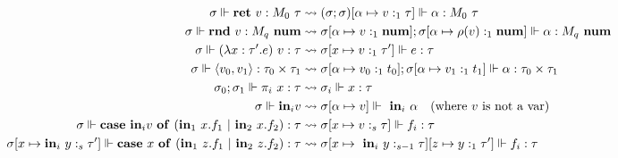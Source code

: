 \begin{figure}
\begin{center}
\begin{equation*}
\begin{aligned}[c]
    \sigma \Vdash \mathbf{ret} \ v : M_0 \ \tau &\rightsquigarrow (\sigma;
    \sigma) [\alpha \mapsto v :_1 \tau] \Vdash \alpha : M_0 \ \tau \\
    \sigma \Vdash \mathbf{rnd} \ v : M_q \ \mathbf{num} &\rightsquigarrow \sigma
    [\alpha \mapsto v :_1 \mathbf{num}]; \sigma [\alpha \mapsto \rho(v) :_1
    \mathbf{num}] \Vdash \alpha : M_q \ \mathbf{num} \\
    \sigma \Vdash (\lambda x : \tau' .e) \ v : \tau &\rightsquigarrow \sigma[x
    \mapsto v :_1 \tau'] \Vdash e : \tau \\
    \sigma \Vdash \langle v_0,v_1 \rangle : \tau_0 \times \tau_1
    &\rightsquigarrow \sigma[\alpha \mapsto v_0 :_1 t_0]; \sigma[\alpha \mapsto
    v_1 :_1 t_1] \Vdash \alpha : \tau_0 \times \tau_1\\
    \sigma_0; \sigma_1 \Vdash \pi_i \ x : \tau &\rightsquigarrow \sigma_i \Vdash x
    : \tau \\ 
    \sigma \Vdash \textbf{in}_i v &\rightsquigarrow \sigma[\alpha \mapsto v]
    \Vdash \ \textbf{in}_i \ \alpha \quad \text{(where $v$ is not a var)} \\
    \sigma \Vdash \mathbf{case} \ \textbf{in}_i v \ \mathbf{of} \ (\textbf{in}_1 \ x.f_1 \ | \
    \textbf{in}_2 \ x.f_2 ) : \tau &\rightsquigarrow \sigma[x \mapsto v :_s \tau]
    \Vdash f_i : \tau \\
    \sigma [x \mapsto \textbf{in}_i \ y :_s \tau'] \Vdash \mathbf{case} \ x \ \mathbf{of} \ (\textbf{in}_1 \
    z.f_1 \ | \ \textbf{in}_2 \ z.f_2 ) : \tau &\rightsquigarrow \sigma[x \mapsto \ \textbf{in}_i \ y
    :_{s-1} \tau][z \mapsto y :_1 \tau'] \Vdash f_i : \tau \\ 
  \end{aligned}
\end{equation*}

\end{center}
\end{figure}

